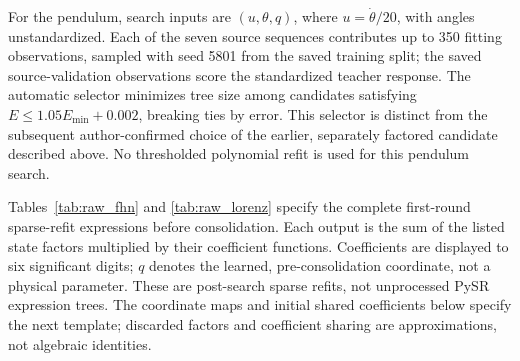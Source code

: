 For the pendulum, search inputs are $(u,\theta,q)$, where $u=\dot\theta/20$, with angles unstandardized. Each of the seven source sequences contributes up to 350 fitting observations, sampled with seed 5801 from the saved training split; the saved source-validation observations score the standardized teacher response. The automatic selector minimizes tree size among candidates satisfying $E\leq1.05E_{\min}+0.002$, breaking ties by error. This selector is distinct from the subsequent author-confirmed choice of the earlier, separately factored candidate described above. No thresholded polynomial refit is used for this pendulum search.

Tables~\ref{tab:raw_fhn} and \ref{tab:raw_lorenz} specify the complete first-round sparse-refit expressions before consolidation. Each output is the sum of the listed state factors multiplied by their coefficient functions. Coefficients are displayed to six significant digits; $q$ denotes the learned, pre-consolidation coordinate, not a physical parameter. These are post-search sparse refits, not unprocessed PySR expression trees. The coordinate maps and initial shared coefficients below specify the next template; discarded factors and coefficient sharing are approximations, not algebraic identities.


\label{supp:search_records_end}
